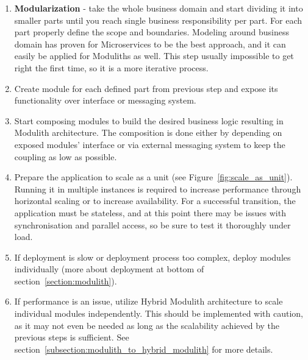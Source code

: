 \begin{enumerate}
    \item \textbf{Modularization} - take the whole business domain and start dividing it into smaller parts until you reach single business responsibility per part. For each part properly define the scope and boundaries. Modeling around business domain has proven for Microservices to be the best approach\cite{BUILDING_MS_WHAT_ARE}, and it can easily be applied for Moduliths as well. This step usually impossible to get right the first time, so it is a more iterative process.
    \item Create module for each defined part from previous step and expose its functionality over interface or messaging system.
    \item Start composing modules to build the desired business logic resulting in Modulith architecture. The composition is done either by depending on exposed modules' interface or via external messaging system to keep the coupling as low as possible.
    \item Prepare the application to scale as a unit (see Figure~\ref{fig:scale_as_unit}). Running it in multiple instances is required to increase performance through horizontal scaling or to increase availability. For a successful transition, the application must be stateless, and at this point there may be issues with synchronisation and parallel access, so be sure to test it thoroughly under load.
    \item If deployment is slow or deployment process too complex, deploy modules individually (more about deployment at bottom of section~\ref{section:modulith}).
    \item If performance is an issue, utilize Hybrid Modulith architecture to scale individual modules independently. This should be implemented with caution, as it may not even be needed as long as the scalability achieved by the previous steps is sufficient. See section~\ref{subsection:modulith_to_hybrid_modulith} for more details.
        

\end{enumerate}
